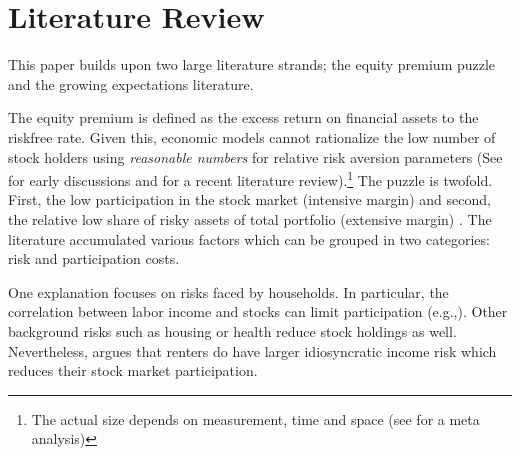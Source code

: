 \documentclass[ProjectABM]{subfiles}
\begin{document}

\section{Literature Review}\label{sec:literature}

This paper builds upon two large literature strands; the equity premium puzzle and the growing expectations literature.

The equity premium is defined as the excess return on financial assets to the riskfree rate. Given this, economic models cannot rationalize the low number of stock holders using \textit{reasonable numbers} for relative risk aversion parameters (See \cite{mehra_porescott_1985equity_premium, haliassos_bertraut_1995equity_premium} for early discussions and \cite{Gomes_et_al_2021} for a recent literature review).\footnote{ The actual size depends on measurement, time and space (see\cite{vanEwijk_et_al_2012meta_equity_premium} for a meta analysis)} The puzzle is twofold. First, the low participation in the stock market (intensive margin) and second, the relative low share of risky assets of total portfolio (extensive margin) \citep{campbell_2006household_finance}. The literature accumulated various factors which can be grouped in two categories: risk and participation costs. %

One explanation focuses on risks faced by households. In particular, the correlation between labor income and stocks can limit participation (e.g.,\cite{BCG2007stocklabor}). Other background risks such as housing \citep{cocco2005housing} or health \citep{GJT1996_health} reduce stock holdings as well. Nevertheless, \cite{catherine2020_countercyclical} argues that renters do have larger idiosyncratic income risk which reduces their stock market participation.%
\end{document}
